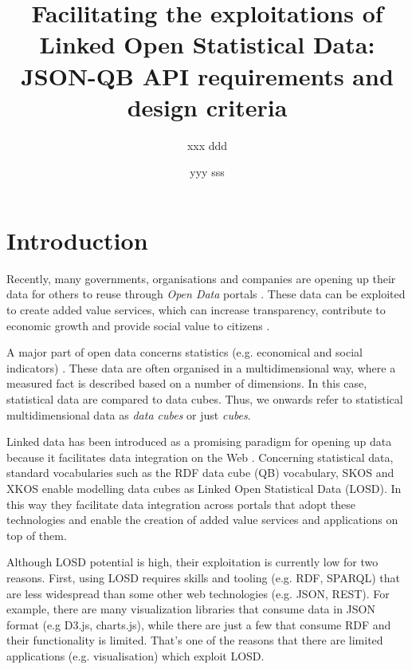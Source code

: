 \documentclass{llncs}
\begin{document}
\title{Facilitating the exploitations of Linked Open Statistical Data: JSON-QB API requirements and design criteria}

\author{xxx ddd \and yyy sss}

\maketitle

\begin{abstract}

\end{abstract}

\section{Introduction}\label{sec:intro}

Recently, many governments, organisations and companies are opening up their data for others to reuse through \textit{Open Data} portals  \cite{Kalampokis:2011:IJWET}. These data can be exploited to create added value services, which can increase transparency, contribute to economic growth and provide social value to citizens \cite{Janssen:2012}.

A major part of open data concerns statistics (e.g. economical and social indicators) \cite{Capadisli:2013}. These data are often organised in a multidimensional way, where a measured fact is described based on a number of dimensions. In this case, statistical data are compared to data cubes. Thus, we onwards refer to statistical multidimensional data as \textit{data cubes} or just \textit{cubes}.

Linked data has been introduced as a promising paradigm for opening up data because it facilitates data integration on the Web \cite{Bizer:2009}. Concerning statistical data, standard vocabularies such as the RDF data cube (QB) vocabulary\cite{Cyganiak:2014:W3C}, SKOS\cite{Miles:2009:W3C} and XKOS\cite{XKOS} enable modelling data cubes as Linked Open Statistical Data (LOSD). In this way they facilitate data integration across portals that adopt these technologies and enable the creation of added value services and applications on top of them.

Although LOSD potential is high, their exploitation is currently low for two reasons. First, using LOSD requires skills and tooling (e.g. RDF, SPARQL) that are less widespread than some other web technologies (e.g. JSON, REST). For example, there are many visualization libraries that consume data in JSON format (e.g D3.js, charts.js), while there are just a few that consume RDF and their functionality is limited. That's one of the reasons that there are limited applications (e.g. visualisation) which exploit LOSD.
\end{document}
